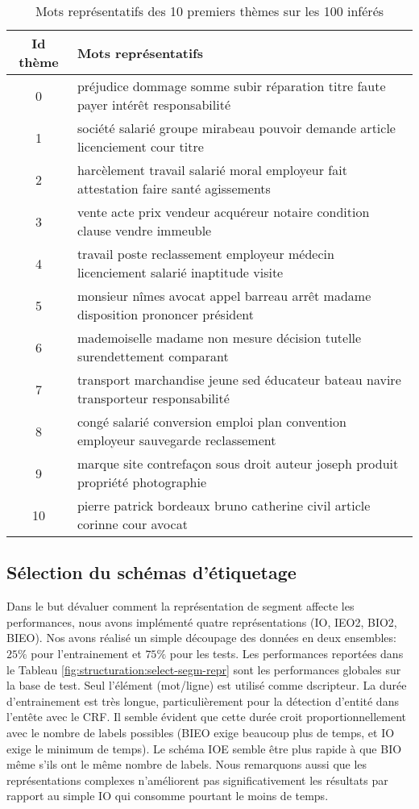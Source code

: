 \begin{table}[!h]
\scriptsize
\begin{center}
\begin{tabular}{c|l}
Id thème & Mots représentatifs  \\ \hline
0	& 	préjudice  dommage  somme  subir  réparation  titre  faute  payer  intérêt  responsabilité  \\ \hline
1	& société  salarié  groupe  mirabeau  pouvoir  demande  article  licenciement  cour  titre    \\ \hline
2	& harcèlement  travail  salarié  moral  employeur  fait  attestation  faire  santé  agissements  \\ \hline
3	& vente  acte  prix  vendeur  acquéreur  notaire  condition  clause  vendre  immeuble  \\ \hline
4	& 		travail  poste  reclassement  employeur  médecin  licenciement  salarié  inaptitude  visite  \\ \hline
5	& 	monsieur  nîmes  avocat  appel  barreau  arrêt  madame  disposition  prononcer  président  \\ \hline
6	& 	mademoiselle  madame  non  mesure  décision  tutelle  surendettement  comparant   \\ \hline
7	& transport  marchandise  jeune  sed  éducateur  bateau  navire  transporteur  responsabilité  \\ \hline
8	&congé  salarié  conversion  emploi  plan  convention  employeur  sauvegarde  reclassement  \\ \hline
9	&marque  site  contrefaçon  sous  droit  auteur  joseph  produit  propriété  photographie  \\ \hline
10	&pierre  patrick  bordeaux  bruno  catherine  civil  article  corinne  cour  avocat\\ \hline
\end{tabular}
\end{center}
\caption{Mots représentatifs des 10 premiers thèmes sur les 100 inférés}\label{p4_topics}
\end{table}


\subsection{Sélection du schémas d'étiquetage}
Dans le but dévaluer comment la représentation de segment affecte les performances, nous avons implémenté quatre représentations (IO, IEO2, BIO2, BIEO).  Nos avons réalisé un simple découpage des données en deux ensembles: $25 \%$ pour l'entrainement et $75 \%$ pour les tests. Les performances reportées dans le Tableau \ref{fig:structuration:select-segm-repr} sont les performances globales sur la base de test. Seul l'élément (mot/ligne) est utilisé comme dscripteur. La durée d'entrainement est très longue, particulièrement pour la détection d'entité dans l'entête avec le CRF. Il semble évident que cette durée croit proportionnellement avec le nombre de labels possibles (BIEO exige beaucoup plus de temps, et IO exige le minimum de temps). Le schéma IOE semble être plus rapide à que BIO même s'ils ont le même nombre de labels. Nous remarquons aussi que les représentations complexes n'améliorent pas significativement les résultats par rapport au simple IO qui consomme pourtant le moins de temps.

